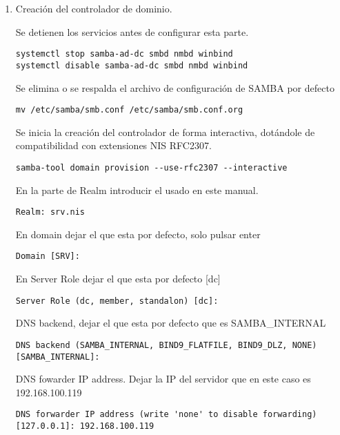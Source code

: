 \documentclass[../main.tex]{subfiles}
\begin{document}
\begin{enumerate}
\begin{enumerate}
  
    \end{enumerate}

  \item Creación del controlador de dominio.

    Se detienen los servicios antes de configurar esta parte.
\lstset{style=mystyle}
    \begin{lstlisting}[style=mystyle]
systemctl stop samba-ad-dc smbd nmbd winbind
systemctl disable samba-ad-dc smbd nmbd winbind
\end{lstlisting}

    Se elimina o se respalda el archivo de configuración de
    SAMBA por defecto
    \begin{lstlisting}
mv /etc/samba/smb.conf /etc/samba/smb.conf.org
\end{lstlisting}

    Se inicia la creación del controlador de forma interactiva, dotándole de compatibilidad con extensiones NIS RFC2307.

    \begin{lstlisting}
samba-tool domain provision --use-rfc2307 --interactive
\end{lstlisting}

    En la parte de Realm introducir el usado en este manual.

    \begin{lstlisting}
Realm: srv.nis
\end{lstlisting}

    En domain dejar el que esta por defecto, solo pulsar enter

    \begin{lstlisting}
Domain [SRV]:
\end{lstlisting}

    En Server Role dejar el que esta por defecto [dc]

    \begin{lstlisting}
Server Role (dc, member, standalon) [dc]:
    \end{lstlisting}

    DNS backend, dejar el que esta por defecto que es SAMBA\_INTERNAL

    \begin{lstlisting}
DNS backend (SAMBA_INTERNAL, BIND9_FLATFILE, BIND9_DLZ, NONE) [SAMBA_INTERNAL]:
\end{lstlisting}

    DNS fowarder IP address. Dejar la IP del servidor que en este caso es 192.168.100.119

    \begin{lstlisting}
DNS forwarder IP address (write 'none' to disable forwarding) [127.0.0.1]: 192.168.100.119
\end{lstlisting}


\end{enumerate}
\end{document}

